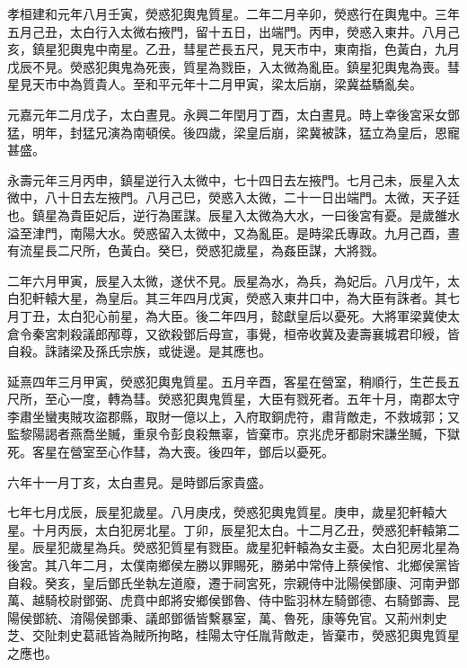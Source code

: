 
\begin{pinyinscope}
孝桓建和元年八月壬寅，熒惑犯輿鬼質星。二年二月辛卯，熒惑行在輿鬼中。三年五月己丑，太白行入太微右掖門，留十五日，出端門。丙申，熒惑入東井。八月己亥，鎮星犯輿鬼中南星。乙丑，彗星芒長五尺，見天巿中，東南指，色黃白，九月戊辰不見。熒惑犯輿鬼為死喪，質星為戮臣，入太微為亂臣。鎮星犯輿鬼為喪。彗星見天巿中為質貴人。至和平元年十二月甲寅，梁太后崩，梁冀益驕亂矣。

元嘉元年二月戊子，太白晝見。永興二年閏月丁酉，太白晝見。時上幸後宮采女鄧猛，明年，封猛兄演為南頓侯。後四歲，梁皇后崩，梁冀被誅，猛立為皇后，恩寵甚盛。

永壽元年三月丙申，鎮星逆行入太微中，七十四日去左掖門。七月己未，辰星入太微中，八十日去左掖門。八月己巳，熒惑入太微，二十一日出端門。太微，天子廷也。鎮星為貴臣妃后，逆行為匿謀。辰星入太微為大水，一曰後宮有憂。是歲雒水溢至津門，南陽大水。熒惑留入太微中，又為亂臣。是時梁氏專政。九月己酉，晝有流星長二尺所，色黃白。癸巳，熒惑犯歲星，為姦臣謀，大將戮。

二年六月甲寅，辰星入太微，遂伏不見。辰星為水，為兵，為妃后。八月戊午，太白犯軒轅大星，為皇后。其三年四月戊寅，熒惑入東井口中，為大臣有誅者。其七月丁丑，太白犯心前星，為大臣。後二年四月，懿獻皇后以憂死。大將軍梁冀使太倉令秦宮刺殺議郎邴尊，又欲殺鄧后母宣，事覺，桓帝收冀及妻壽襄城君印綬，皆自殺。誅諸梁及孫氏宗族，或徙邊。是其應也。

延熹四年三月甲寅，熒惑犯輿鬼質星。五月辛酉，客星在營室，稍順行，生芒長五尺所，至心一度，轉為彗。熒惑犯輿鬼質星，大臣有戮死者。五年十月，南郡太守李肅坐蠻夷賊攻盜郡縣，取財一億以上，入府取銅虎符，肅背敵走，不救城郭；又監黎陽謁者燕喬坐贓，重泉令彭良殺無辜，皆棄巿。京兆虎牙都尉宋謙坐贓，下獄死。客星在營室至心作彗，為大喪。後四年，鄧后以憂死。

六年十一月丁亥，太白晝見。是時鄧后家貴盛。

七年七月戊辰，辰星犯歲星。八月庚戌，熒惑犯輿鬼質星。庚申，歲星犯軒轅大星。十月丙辰，太白犯房北星。丁卯，辰星犯太白。十二月乙丑，熒惑犯軒轅第二星。辰星犯歲星為兵。熒惑犯質星有戮臣。歲星犯軒轅為女主憂。太白犯房北星為後宮。其八年二月，太僕南鄉侯左勝以罪賜死，勝弟中常侍上蔡侯悺、北鄉侯黨皆自殺。癸亥，皇后鄧氏坐執左道廢，遷于祠宮死，宗親侍中沘陽侯鄧康、河南尹鄧萬、越騎校尉鄧弼、虎賁中郎將安鄉侯鄧魯、侍中監羽林左騎鄧德、右騎鄧壽、昆陽侯鄧統、淯陽侯鄧秉、議郎鄧循皆繫暴室，萬、魯死，康等免官。又荊州刺史芝、交阯刺史葛祗皆為賊所拘略，桂陽太守任胤背敵走，皆棄巿，熒惑犯輿鬼質星之應也。


\end{pinyinscope}
